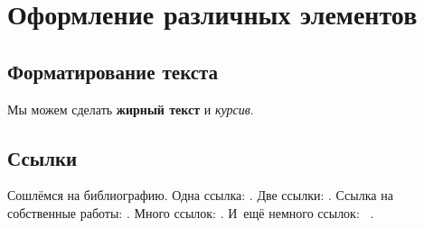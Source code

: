 \chapter{Оформление различных элементов}\label{ch:ch1}

\section{Форматирование текста}\label{sec:ch1/sec1}

Мы можем сделать \textbf{жирный текст} и \textit{курсив}.

\section{Ссылки}\label{sec:ch1/sec2}

Сошлёмся на библиографию.
Одна ссылка: \cite[с.~54]{Sokolov}\cite[с.~36]{Gaidaenko}.
Две ссылки: \cite{Sokolov,Gaidaenko}.
Ссылка на собственные работы: \cite{vakbib1, confbib2}.
Много ссылок: %
\cite{Lermontov, Management, Borozda, Marketing, Constitution, FamilyCode,
Gost.7.0.53, Razumovski, Lagkueva, Pokrovski, Methodology, Nasirova, Berestova,
Kriger}%
%
.
И~ещё немного ссылок:~\cite{Article,Book,Booklet,Conference,Inbook,Incollection,Manual,Mastersthesis,
Misc,Phdthesis,Proceedings,Techreport,Unpublished}
\cite{medvedev2006jelektronnye, CEAT:CEAT581, doi:10.1080/01932691.2010.513279,
Gosele1999161,Li2007StressAnalysis, Shoji199895, test:eisner-sample,
test:eisner-sample-shorted, AB_patent_Pomerantz_1968, iofis_patent1960}
%
.

%

